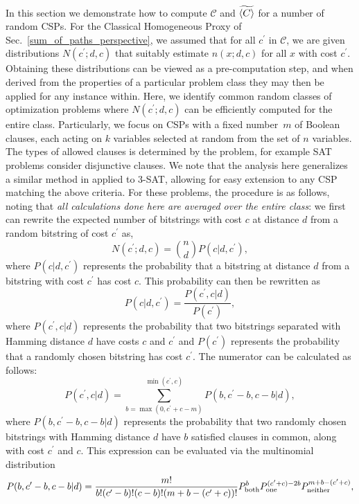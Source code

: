 \documentclass[superscriptaddress,pra,aps,10pt,longbibliography,notitlepage]{revtex4-1}
\newcommand{\Prob}[1]{\ensuremath{P_{\textnormal{#1}}}}
\newcommand{\Pboth}{\Prob{both}}
\newcommand{\Pone}{\Prob{one}}
\newcommand{\Pneither}{\Prob{neither}}
\newcommand*\cp{c^\prime}
\begin{document}
In this section we demonstrate how to compute $\mathcal{C}$ and $\widetilde{\braket{C}}$ for a number of random CSPs. For the Classical Homogeneous Proxy of Sec.~\ref{sum_of_paths_perspective}, we assumed that for all $\cp$ in $\mathcal{C}$, we are given distributions $N(\cp;d,c)$ that suitably estimate $n(x;d,c)$ for all $x$ with cost $\cp$. Obtaining these distributions can be viewed as a pre-computation step, and when derived from the properties of a particular problem class they may then be applied for any instance within. Here, we identify common random classes of optimization problems where $N(\cp;d,c)$ can be efficiently computed for the entire class. Particularly, we focus on CSPs with a fixed number~$m$ of Boolean clauses, each acting on $k$ variables selected at random from the set of $n$ variables. The types of allowed clauses is determined by the problem, for example SAT problems consider disjunctive clauses. We note that the analysis here generalizes a similar method in \cite{hogg00} applied to 3-SAT, allowing for easy extension to any CSP matching the above criteria. For these problems, the procedure is as follows, noting that \emph{all calculations done here are averaged over the entire class}: we first can rewrite the expected number of bitstrings with cost $c$ at distance $d$ from a random bitstring of cost $\cp$ as,
\begin{equation}\label{eq:rand_n_dist_start}
    N(\cp;d,c) = \binom{n}{d}P(c|d,\cp),
\end{equation}
where $P(c|d,\cp)$ represents the probability that a bitstring at distance $d$ from a bitstring with cost $\cp$ has cost $c$. This probability can then be rewritten as 
\begin{equation}\label{eq:p_of_cprime_given_d_and_c}
P(c|d,\cp) = \frac{P(\cp,c|d)}{P(\cp)} ,
\end{equation}
where $P(\cp,c|d)$ represents the probability that two bitstrings separated with Hamming distance $d$ have costs $c$ and $\cp$ and $ P(\cp)$ represents the probability that a randomly chosen bitstring has cost $\cp$. The numerator can be calculated as follows:
\begin{equation}
P(\cp,c|d) = \sum_{b=\max(0, \cp+c-m)}^{\min(\cp,c)} P(b, \cp-b, c-b | d),
\end{equation}
where $P(b, \cp-b, c-b | d)$ represents the probability that two randomly chosen bitstrings with Hamming distance $d$ have $b$ satisfied clauses in common, along with cost $\cp$ and $c$. This expression can be evaluated via the multinomial distribution
\begin{equation}
P(b, \cp-b, c-b | d) = \frac{m!}{b!(\cp-b)!(c-b)!(m+b-(\cp+c))!} \Pboth^b \Pone^{(\cp+c)-2b} \Pneither^{m+b-(\cp+c)},
\end{equation}
\end{document}
